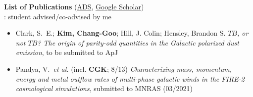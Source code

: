 \documentclass[12pt,preprint,letter]{aastex63}
\begin{document}
\begin{itemize}
\clearpage

\begin{center}
{\bf List of Publications} (\href{https://ui.adsabs.harvard.edu/search/q=\%3Dauthor\%3A\%22kim\%2Cchang-goo\%22}{ADS}, 
\href{https://scholar.google.com/citations?user=jBOsJgoAAAAJ&hl=en}{Google Scholar})\\
{: student advised/co-advised by me}\\
    
\end{center}

\begin{itemize}[itemsep=1pt]

\end{itemize}

\begin{itemize}[itemsep=1pt]

\end{itemize}

\begin{itemize}[itemsep=1pt]

\end{itemize}

\begin{itemize}[itemsep=1pt]

\item Clark, S.~E.; \textbf{Kim, Chang-Goo}; Hill, J. Colin; Hensley, Brandon S. \textit{$TB$, or not $TB$? The origin of parity-odd quantities in the Galactic polarized dust emission}, to be submitted to ApJ

\item Pandya, V.~\textit{et al.} (incl. {\bf CGK}; 8/13) \textit{Characterizing mass, momentum, energy and metal outflow rates of multi-phase galactic winds in the FIRE-2 cosmological simulations}, submitted to MNRAS (03/2021)


\end{itemize}
\end{itemize}
\end{document}
